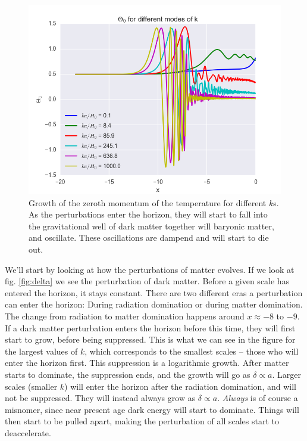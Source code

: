 \documentclass[a4paper,norsk, 10pt]{article}
\begin{document}
\begin{figure}[!htbp]
\centering
\includegraphics[scale=0.5]{Theta_0.png}
\caption{Growth of the zeroth momentum of the temperature for different $k$s. As the perturbations enter the horizon, they will start to fall into the gravitational well of dark matter together will baryonic matter, and oscillate. These oscillations are dampend and will start to die out.}\label{fig:theta}
\end{figure}




We'll start by looking at how the perturbations of matter evolves. If we look at fig. \ref{fig:delta} we see the perturbation of dark matter. Before a given scale has entered the horizon, it stays constant. There are two different eras a perturbation can enter the horizon: During radiation domination or during matter domination. The change from radiation to matter domination happens around $x\approx -8$ to $-9$. If a dark matter perturbation enters the horizon before this time, they will first start to grow, before being suppressed. This is what we can see in the figure for the largest values of $k$, which corresponds to the smallest scales -- those who will enter the horizon first. This suppression is a logarithmic growth. After matter starts to dominate, the suppression ends, and the growth will go as $\delta \propto a$. Larger scales (smaller $k$) will enter the horizon after the radiation domination, and will not be suppressed. They will instead always grow as $\delta \propto a$. \textit{Always} is of course a misnomer, since near present age dark energy will start to dominate. Things will then start to be pulled apart, making the perturbation of all scales start to deaccelerate. 
\end{document}
